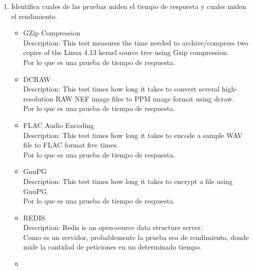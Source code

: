 \documentclass{article}
\begin{document}
    \begin{enumerate}
        \item {
            Identifica cuales de las pruebas miden el tiempo de respuesta y 
            cuales miden el rendimiento.

            \begin{itemize}
                \item {
                    GZip Compression \\
                    Description: This test measures the time needed to 
                    archive/compress two copies of the Linux 4.13 kernel source 
                    tree using Gzip compression.\\
                    Por lo que es una prueba de tiempo de respuesta.

                }
                \item {
                    DCRAW \\
                    Description: This test times how long it takes to convert 
                    several high-resolution RAW NEF image files to PPM image 
                    format using dcraw.\\
                    Por lo que es una prueba de tiempo de respuesta.
                }
                \item {
                    FLAC Audio Encoding \\
                    Description: This test times how long it takes to encode a 
                    sample WAV file to FLAC format five times.\\
                    Por lo que es una prueba de tiempo de respuesta.
                }
                \item {
                    GnuPG \\
                    Description: This test times how long it takes to encrypt 
                    a file using GnuPG. \\
                    Por lo que es una prueba de tiempo de respuesta.
                }
                \item {
                    REDIS \\
                    Description: Redis is an open-source data structure server.\\
                    Como es un servidor, probablemente la prueba sea de 
                    rendimiento, donde mide la cantidad de peticiones en un 
                    determinado tiempo.
                }
                \item {
}
\end{itemize}}
\end{enumerate}
\end{document}

